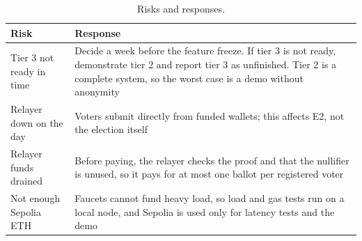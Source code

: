 \begin{table}[htbp]
  \centering
  \caption{Risks and responses.}
  \label{tab:risks}
  \small
  \begin{tabular}{@{}L{4.0cm}L{9.8cm}@{}}
    \toprule
    \textbf{Risk}            & \textbf{Response}                                                                                                             \\
    \midrule
    Tier 3 not ready in time & Decide a week before the feature freeze. If tier 3 is not ready, demonstrate tier 2 and report tier 3 as unfinished. Tier 2 is a complete system, so the worst case is a demo without anonymity \\
    Relayer down on the day  & Voters submit directly from funded wallets; this affects E2, not the election itself                                              \\
    Relayer funds drained    & Before paying, the relayer checks the proof and that the nullifier is unused, so it pays for at most one ballot per registered voter \\
    Not enough Sepolia ETH   & Faucets cannot fund heavy load, so load and gas tests run on a local node, and Sepolia is used only for latency tests and the demo \\
    \bottomrule
  \end{tabular}
\end{table}
